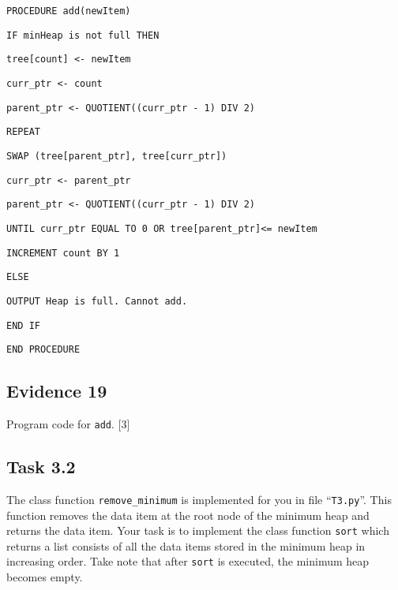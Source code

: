 \noindent %
\noindent\begin{minipage}[t]{1\columnwidth}%
\texttt{PROCEDURE add(newItem) }

\texttt{\qquad{}IF minHeap is not full THEN}

\texttt{\qquad{}\qquad{}tree{[}count{]} <- newItem}

\texttt{\qquad{}\qquad{}curr\_ptr <- count }

\texttt{\qquad{}\qquad{}parent\_ptr <- QUOTIENT((curr\_ptr - 1)
DIV 2)}

\texttt{\qquad{}\qquad{}REPEAT }

\texttt{\qquad{}\qquad{}\qquad{}SWAP (tree{[}parent\_ptr{]}, tree{[}curr\_ptr{]}) }

\texttt{\qquad{}\qquad{}\qquad{}curr\_ptr <- parent\_ptr }

\texttt{\qquad{}\qquad{}\qquad{}parent\_ptr <- QUOTIENT((curr\_ptr
- 1) DIV 2)}

\texttt{\qquad{}\qquad{}UNTIL curr\_ptr EQUAL TO 0 OR tree{[}parent\_ptr{]}<=
newItem}

\texttt{\qquad{}\qquad{}INCREMENT count BY 1 }

\texttt{\qquad{}ELSE }

\texttt{\qquad{}\qquad{}OUTPUT \textquotedbl Heap is full. Cannot
add.\textquotedbl{} }

\texttt{\qquad{}END IF }

\texttt{END PROCEDURE}%
\end{minipage}

\subsection*{Evidence 19 }

Program code for \texttt{add}. \hfill{} {[}3{]}

\subsection*{Task 3.2 }

The class function \texttt{remove\_minimum} is implemented for you
in file \textquotedblleft \texttt{T3.py}\textquotedblright . This
function removes the data item at the root node of the minimum heap
and returns the data item. Your task is to implement the class function
\texttt{sort} which returns a list consists of all the data items
stored in the minimum heap in increasing order. Take note that after
\texttt{sort} is executed, the minimum heap becomes empty. 

